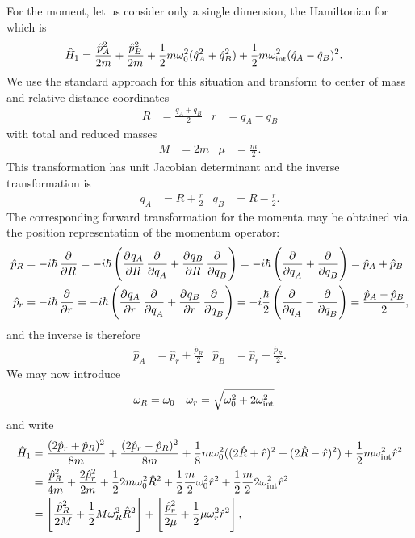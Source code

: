 For the moment, let us consider only a single dimension, the Hamiltonian for which is
\begin{align}
	\hat{H}_1
	&= \frac{\hat{p}_A^2}{2 m} + \frac{\hat{p}_B^2}{2 m}
		+ \frac{1}{2} m \omega_0^2 (\hat{q}_A^2 + \hat{q}_B^2)
		+ \frac{1}{2} m \omega_\text{int}^2 (\hat{q}_A - \hat{q}_B)^2.
\end{align}
We use the standard approach for this situation and transform to center of mass and relative distance coordinates
\begin{align}
	R
	&= \frac{q_A + q_B}{2}
	&
	r
	&= q_A - q_B
		\label{eq:oscillators-Rr}
\end{align}
with total and reduced masses
\begin{align}
	M
	&= 2 m
	&
	\mu
	&= \frac{m}{2}.
\end{align}
This transformation has unit Jacobian determinant and the inverse transformation is
\begin{align}
	q_A
	&= R + \frac{r}{2}
	&
	q_B
	&= R - \frac{r}{2}.
\end{align}
The corresponding forward transformation for the momenta may be obtained via the position representation of the momentum operator:
\begin{subequations}
\begin{align}
	\hat{p}_R
	&= -i \hbar \dpd{}{R}
	= -i \hbar \left( \dpd{q_A}{R} \dpd{}{q_A} + \dpd{q_B}{R} \dpd{}{q_B} \right)
	= -i \hbar \left( \dpd{}{q_A} + \dpd{}{q_B} \right)
	= \hat{p}_A + \hat{p}_B \\
	\hat{p}_r
	&= -i \hbar \dpd{}{r}
	= -i \hbar \left( \dpd{q_A}{r} \dpd{}{q_A} + \dpd{q_B}{r} \dpd{}{q_B} \right)
	= -i \frac{\hbar}{2} \left( \dpd{}{q_A} - \dpd{}{q_B} \right)
	= \frac{\hat{p}_A - \hat{p}_B}{2},
\end{align}
\end{subequations}
and the inverse is therefore
\begin{align}
	\hat{p}_A
	&= \hat{p}_r + \frac{\hat{p}_R}{2}
	&
	\hat{p}_B
	&= \hat{p}_r - \frac{\hat{p}_R}{2}.
\end{align}
We may now introduce
\begin{align}
	\omega_R
	&= \omega_0
	&
	\omega_r
	&= \sqrt{\omega_0^2 + 2 \omega_\text{int}^2}
\end{align}
and write
\begin{subequations}
\begin{align}
	\hat{H}_1
	&= \frac{(2 \hat{p}_r + \hat{p}_R)^2}{8 m}
		+ \frac{(2 \hat{p}_r - \hat{p}_R)^2}{8 m}
		+ \frac{1}{8} m \omega_0^2 ((2 \hat{R} + \hat{r})^2 + (2 \hat{R} - \hat{r})^2)
		+ \frac{1}{2} m \omega_\text{int}^2 \hat{r}^2 \\
	&= \frac{\hat{p}_R^2}{4 m} + \frac{2 \hat{p}_r^2}{2 m}
		+ \frac{1}{2} 2 m \omega_0^2 \hat{R}^2
		+ \frac{1}{2} \frac{m}{2} \omega_0^2 \hat{r}^2
		+ \frac{1}{2} \frac{m}{2} 2 \omega_\text{int}^2 \hat{r}^2 \\
	&= \left[ \frac{\hat{p}_R^2}{2 M} + \frac{1}{2} M \omega_R^2 \hat{R}^2 \right]
		+ \left[ \frac{\hat{p}_r^2}{2 \mu} + \frac{1}{2} \mu \omega_r^2 \hat{r}^2 \right],
\end{align}
\end{subequations}
